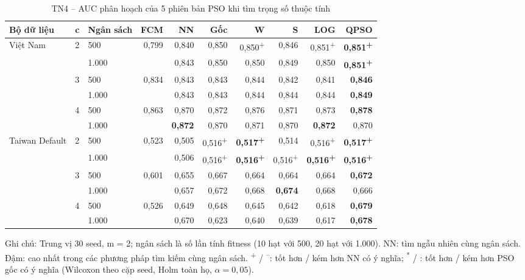 \begin{table}[htbp]
\centering
\caption{TN4 -- AUC phân hoạch của 5 phiên bản PSO khi tìm trọng số thuộc tính}
\label{tab:e9-auc}
\footnotesize
\setlength{\tabcolsep}{3pt}
\begin{tabular}{@{}lllrrrrrrr@{}}
\toprule
Bộ dữ liệu & c & Ngân sách & FCM & NN & Gốc & W & S & LOG & QPSO \\
\midrule
Việt Nam & 2 & 500 & 0,799 & 0,840 & 0,850 & 0,850\textsuperscript{+} & 0,846 & 0,851\textsuperscript{+} & \textbf{0,851\textsuperscript{+}} \\
 &  & 1.000 &  & 0,843 & 0,850 & 0,850 & 0,849 & 0,850 & \textbf{0,851\textsuperscript{+}} \\
 & 3 & 500 & 0,834 & 0,843 & 0,843 & 0,844 & 0,842 & 0,841 & \textbf{0,846} \\
 &  & 1.000 &  & 0,843 & 0,843 & 0,844 & 0,844 & 0,844 & \textbf{0,849} \\
 & 4 & 500 & 0,863 & 0,870 & 0,872 & 0,876 & 0,871 & 0,873 & \textbf{0,878} \\
 &  & 1.000 &  & \textbf{0,872} & 0,870 & 0,871 & 0,870 & \textbf{0,872} & 0,870 \\
\midrule
Taiwan Default & 2 & 500 & 0,523 & 0,505 & 0,516\textsuperscript{+} & \textbf{0,517\textsuperscript{+}} & 0,514 & 0,516\textsuperscript{+} & \textbf{0,517\textsuperscript{+}} \\
 &  & 1.000 &  & 0,506 & 0,516\textsuperscript{+} & \textbf{0,516\textsuperscript{+}} & 0,516\textsuperscript{+} & \textbf{0,516\textsuperscript{+}} & \textbf{0,516\textsuperscript{+}} \\
 & 3 & 500 & 0,601 & 0,655 & 0,667 & 0,664 & 0,664 & 0,664 & \textbf{0,672} \\
 &  & 1.000 &  & 0,657 & 0,672 & 0,668 & \textbf{0,674} & 0,668 & 0,666 \\
 & 4 & 500 & 0,526 & 0,649 & 0,648 & 0,645 & 0,642 & 0,618 & \textbf{0,679} \\
 &  & 1.000 &  & 0,670 & 0,623 & 0,640 & 0,639 & 0,617 & \textbf{0,678} \\
\bottomrule
\end{tabular}
\par\smallskip\parbox{\linewidth}{\scriptsize Ghi chú: Trung vị 30 seed, m = 2; ngân sách là số lần tính fitness (10 hạt với 500, 20 hạt với 1.000). NN: tìm ngẫu nhiên cùng ngân sách. Đậm: cao nhất trong các phương pháp tìm kiếm cùng ngân sách. \textsuperscript{+} / \textsuperscript{--}: tốt hơn / kém hơn NN có ý nghĩa; \textsuperscript{*} / \textsuperscript{\dag}: tốt hơn / kém hơn PSO gốc có ý nghĩa (Wilcoxon theo cặp seed, Holm toàn họ, $\alpha = 0{,}05$).}
\end{table}
